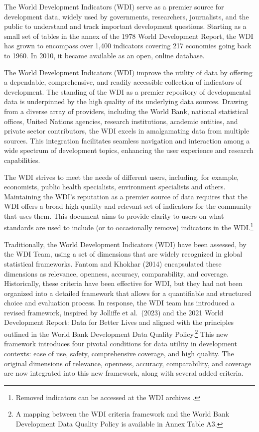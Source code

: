 \documentclass[
  11pt,
  a4paper,
  DIV=11,
  numbers=noendperiod]{scrreprt}
\begin{document}
The World Development Indicators (WDI) serve as a premier source for
development data, widely used by governments, researchers, journalists,
and the public to understand and track important development questions.
Starting as a small set of tables in the annex of the 1978 World
Development Report, the WDI has grown to encompass over 1,400 indicators
covering 217 economies going back to 1960. In 2010, it became available
as an open, online database.

The World Development Indicators (WDI) improve the utility of data by
offering a dependable, comprehensive, and readily accessible collection
of indicators of development. The standing of the WDI as a premier
repository of developmental data is underpinned by the high quality of
its underlying data sources. Drawing from a diverse array of providers,
including the World Bank, national statistical offices, United Nations
agencies, research institutions, academic entities, and private sector
contributors, the WDI excels in amalgamating data from multiple sources.
This integration facilitates seamless navigation and interaction among a
wide spectrum of development topics, enhancing the user experience and
research capabilities.

The WDI strives to meet the needs of different users, including, for
example, economists, public health specialists, environment specialists
and others. Maintaining the WDI's reputation as a premier source of data
requires that the WDI offers a broad high quality and relevant set of
indicators for the community that uses them. This document aims to
provide clarity to users on what standards are used to include (or to
occasionally remove) indicators in the WDI.\footnote{Removed indicators
  can be accessed at the WDI archives .}

Traditionally, the World Development Indicators (WDI) have been
assessed, by the WDI Team, using a set of dimensions that are widely
recognized in global statistical frameworks. Fantom and Khokhar (2014)
encapsulated these dimensions as relevance, openness, accuracy,
comparability, and coverage. Historically, these criteria have been
effective for WDI, but they had not been organized into a detailed
framework that allows for a quantifiable and structured choice and
evaluation process. In response, the WDI team has introduced a revised
framework, inspired by Jolliffe et al.~(2023) and the 2021 World
Development Report: Data for Better Lives and aligned with the
principles outlined in the {World Bank Development Data Quality
Policy}.\footnote{A mapping between the WDI criteria framework and the
  World Bank Development Data Quality Policy is available in Annex Table
  A3.} This new framework introduces four pivotal conditions for data
utility in development contexts: ease of use, safety, comprehensive
coverage, and high quality. The original dimensions of relevance,
openness, accuracy, comparability, and coverage are now integrated into
this new framework, along with several added criteria.
\end{document}
